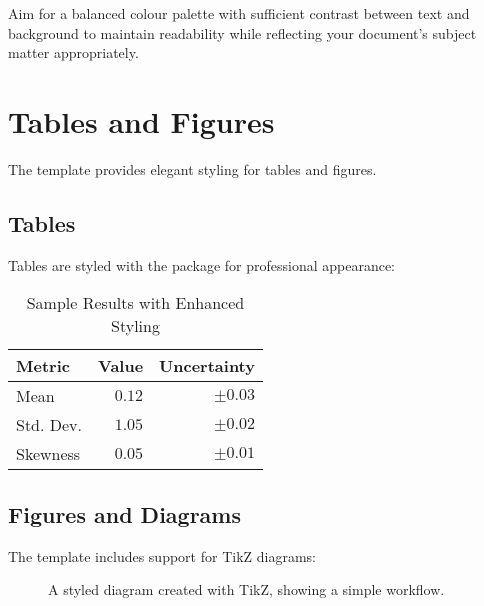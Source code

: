 \documentclass[a4paper,11pt]{article}
\begin{document}
Aim for a balanced colour palette with sufficient contrast between text and background to maintain readability while reflecting your document's subject matter appropriately.

\section{Tables and Figures}
The template provides elegant styling for tables and figures.

\subsection{Tables}
Tables are styled with the  package for professional appearance:

\begin{table}[h!]
    \centering
    \caption{Sample Results with Enhanced Styling}
    \label{tab:results}
    \begin{tabular}{@{}lrr@{}}
        \toprule
        Metric    & Value     & Uncertainty \\
        \midrule
        Mean      & $0.12$    & $\pm 0.03$  \\
        Std. Dev. & $1.05$    & $\pm 0.02$  \\
        Skewness  & $0.05$    & $\pm 0.01$  \\
        \bottomrule
    \end{tabular}
\end{table}

\subsection{Figures and Diagrams}
The template includes support for TikZ diagrams:

\begin{figure}[h!]
    \centering
    \caption{A styled diagram created with TikZ, showing a simple workflow.}
    \label{fig:tikzflow}
\end{figure}
\end{document}
